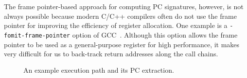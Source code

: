 The frame pointer-based approach for computing PC signatures, however, is not
always possible because modern C/C++ compilers often do not use the frame
pointer for improving the efficiency of register allocation.
One example is a
{\tt -fomit-frame-pointer} option of GCC~\cite{GCC}. 
Although this option allows the frame pointer to be used as a general-purpose
register for high performance, it makes very difficult for us to back-track
return addresses along the call chains.  

\begin{figure}[b]
	\centering
	\vspace{-16pt}
	\vspace{-10pt}
	\hfill
	\vspace{-10pt}
	\caption{An example execution path and its PC extraction.} %
	\label{fig:getpc}
\end{figure}

